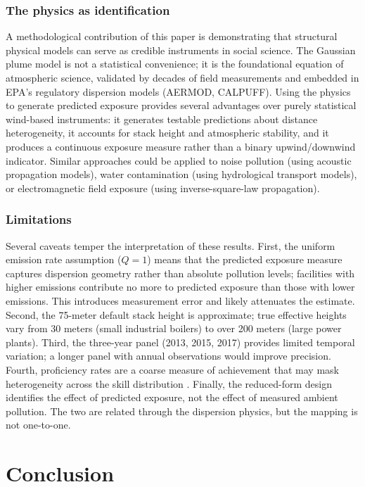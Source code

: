 \documentclass[12pt]{article}
\begin{document}
\subsubsection*{The physics as identification} A methodological contribution of this paper is demonstrating that structural physical models can serve as credible instruments in social science. The Gaussian plume model is not a statistical convenience; it is the foundational equation of atmospheric science, validated by decades of field measurements and embedded in EPA's regulatory dispersion models (AERMOD, CALPUFF). Using the physics to generate predicted exposure provides several advantages over purely statistical wind-based instruments: it generates testable predictions about distance heterogeneity, it accounts for stack height and atmospheric stability, and it produces a continuous exposure measure rather than a binary upwind/downwind indicator. Similar approaches could be applied to noise pollution (using acoustic propagation models), water contamination (using hydrological transport models), or electromagnetic field exposure (using inverse-square-law propagation).

\subsubsection*{Limitations} Several caveats temper the interpretation of these results. First, the uniform emission rate assumption ($Q = 1$) means that the predicted exposure measure captures dispersion geometry rather than absolute pollution levels; facilities with higher emissions contribute no more to predicted exposure than those with lower emissions. This introduces measurement error and likely attenuates the estimate. Second, the 75-meter default stack height is approximate; true effective heights vary from 30 meters (small industrial boilers) to over 200 meters (large power plants). Third, the three-year panel (2013, 2015, 2017) provides limited temporal variation; a longer panel with annual observations would improve precision. Fourth, proficiency rates are a coarse measure of achievement that may mask heterogeneity across the skill distribution \citep{graffzivin2013}. Finally, the reduced-form design identifies the effect of predicted exposure, not the effect of measured ambient pollution. The two are related through the dispersion physics, but the mapping is not one-to-one.


\section{Conclusion}
\end{document}
